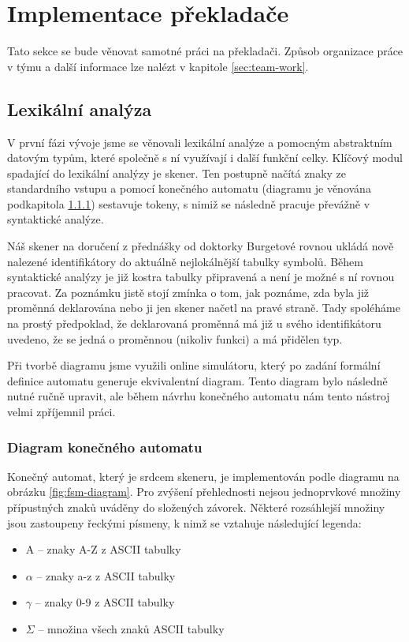 \documentclass[11pt,a4paper]{article}
\newcommand\Alpha{\mathrm{A}} %
\begin{document}
\section{Implementace překladače}

Tato sekce se bude věnovat samotné práci na překladači. Způsob organizace práce v týmu a další informace lze nalézt v kapitole \ref{sec:team-work}.

    \subsection{Lexikální analýza}
    V první fázi vývoje jsme se věnovali lexikální analýze a pomocným abstraktním datovým typům, které společně s ní využívají i další funkční celky. Klíčový modul spadající do lexikální analýzy je skener. Ten postupně načítá znaky ze standardního vstupu a pomocí konečného automatu (diagramu je věnována podkapitola \ref{sec:fsm-diagram}) sestavuje tokeny, s nimiž se následně pracuje převážně v syntaktické analýze.
    
    Náš skener na doručení z přednášky od doktorky Burgetové rovnou ukládá nově nalezené identifikátory do aktuálně nejlokálnější tabulky symbolů. Během syntaktické analýzy je již kostra tabulky připravená a není je možné s ní rovnou pracovat. Za poznámku jistě stojí zmínka o tom, jak poznáme, zda byla již proměnná deklarována nebo ji jen skener načetl na pravé straně. Tady spoléháme na prostý předpoklad, že deklarovaná proměnná má již u svého identifikátoru uvedeno, že se jedná o proměnnou (nikoliv funkci) a má přidělen typ.
    
    Při tvorbě diagramu jsme využili online simulátoru\cite{fsm-simulator}, který po zadání formální definice automatu generuje ekvivalentní diagram. Tento diagram bylo následně nutné ručně upravit, ale během návrhu konečného automatu nám tento nástroj velmi zpříjemnil práci.
    
        \subsubsection{Diagram konečného automatu}
        \label{sec:fsm-diagram}
        Konečný automat, který je srdcem skeneru, je implementován podle diagramu na obrázku \ref{fig:fsm-diagram}. Pro zvýšení přehlednosti nejsou jednoprvkové množiny přípustných znaků uváděny do složených závorek. Některé rozsáhlejší množiny jsou zastoupeny řeckými písmeny, k nimž se vztahuje následující legenda:
        \begin{itemize}
            \item $\Alpha$ -- znaky A-Z z ASCII tabulky
            \item $\alpha$ -- znaky a-z z ASCII tabulky
            \item $\gamma$ -- znaky 0-9 z ASCII tabulky
            \item $\Sigma$ -- množina všech znaků ASCII tabulky
        \end{itemize}
    
\end{document}

